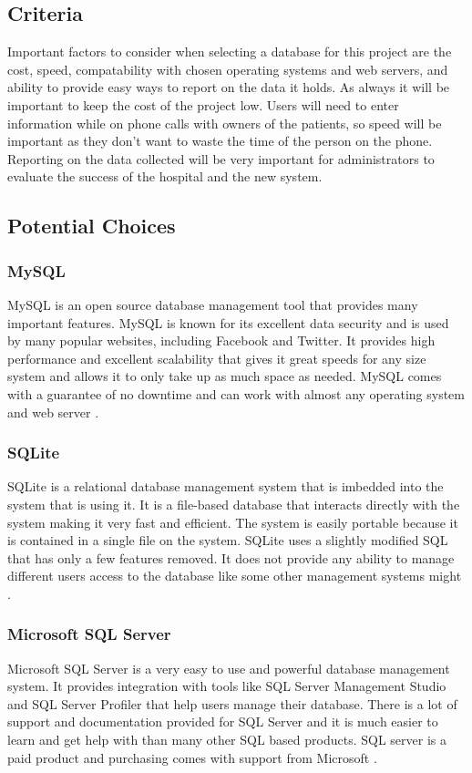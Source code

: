 \documentclass[onecolumn, draftclsnofoot,10pt, compsoc]{IEEEtran}
\begin{document}
\subsection{Criteria}
Important factors to consider when selecting a database for this project are the cost, speed, compatability with chosen operating systems and web servers, and ability to provide easy ways to report on the data it holds. As always it will be important to keep the cost of the project low. Users will need to enter information while on phone calls with owners of the patients, so speed will be important as they don't want to waste the time of the person on the phone. Reporting on the data collected will be very important for administrators to evaluate the success of the hospital and the new system.

\subsection{Potential Choices}

\subsubsection{MySQL}
MySQL is an open source database management tool that provides many important features. MySQL is known for its excellent data security and is used by many popular websites, including Facebook and Twitter. It provides high performance and excellent scalability that gives it great speeds for any size system and allows it to only take up as much space as needed. MySQL comes with a guarantee of no downtime and can work with almost any operating system and web server \cite{mysql}.

\subsubsection{SQLite}
SQLite is a relational database management system that is imbedded into the system that is using it. It is a file-based database that interacts directly with the system making it very fast and efficient. The system is easily portable because it is contained in a single file on the system. SQLite uses a slightly modified SQL that has only a few features removed. It does not provide any ability to manage different users access to the database like some other management systems might \cite{sqlite}.

\subsubsection{Microsoft SQL Server}
Microsoft SQL Server is a very easy to use and powerful database management system. It provides integration with tools like SQL Server Management Studio and SQL Server Profiler that help users manage their database. There is a lot of support and documentation provided for SQL Server and it is much easier to learn and get help with than many other SQL based products. SQL server is a paid product and purchasing comes with support from Microsoft \cite{sqlserver}.
\end{document}
